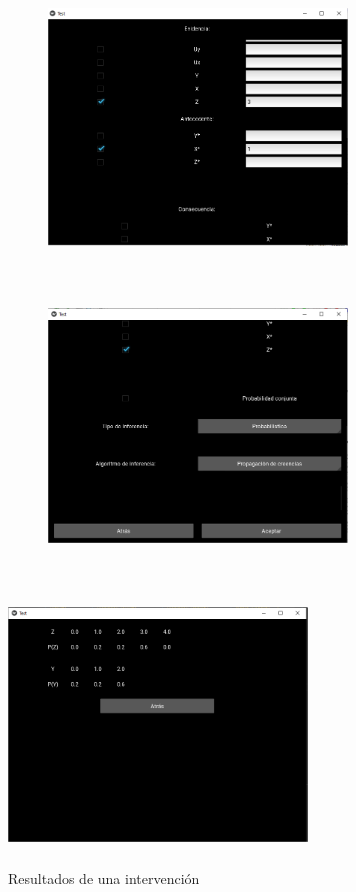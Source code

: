\begin{figure}
	\begin{subfigure}{\linewidth}
		\centering
		\includegraphics[width=300px, height=280px]{./images/Chapter-3/counterfactual(1)}
		\subcaption{}
		\label{fig:counterfactual-1}
	\end{subfigure}
	\begin{subfigure}{\linewidth}
		\centering
		\includegraphics[width=300px, height=280px]{./images/Chapter-3/counterfactual(2)}
		\subcaption{}
		\label{fig:counterfactual-2}
	\end{subfigure}
	\label{fig:counterfactual}
\end{figure}

\begin{figure}
	\centering
	\includegraphics[width=300px, height=280px]{./images/Chapter-3/intervention-result}
	\caption{Resultados de una intervención}
	\label{fig:intervention}
\end{figure}